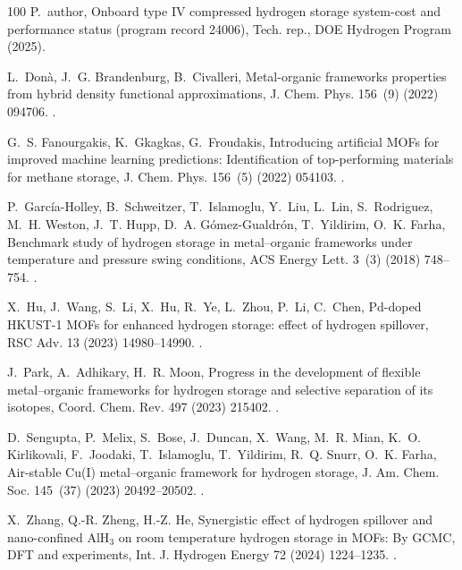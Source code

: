 \documentclass[review]{elsarticle}
\begin{document}
\begin{thebibliography}{100}
P.~author, Onboard type {IV} compressed hydrogen storage system-cost and
  performance status (program record 24006), Tech. rep., DOE Hydrogen Program
  (2025).

L.~Donà, J.~G. Brandenburg, B.~Civalleri, Metal-organic frameworks properties
  from hybrid density functional approximations, J. Chem. Phys. 156~(9) (2022)
  094706.
\newblock \href {https://doi.org/10.1063/5.0080359}
  {}.

G.~S. Fanourgakis, K.~Gkagkas, G.~Froudakis, Introducing artificial {MOFs} for
  improved machine learning predictions: Identification of top-performing
  materials for methane storage, J. Chem. Phys. 156~(5) (2022) 054103.
\newblock \href {https://doi.org/10.1063/5.0075994}
  {}.

P.~Garc\'ia-Holley, B.~Schweitzer, T.~Islamoglu, Y.~Liu, L.~Lin, S.~Rodriguez,
  M.~H. Weston, J.~T. Hupp, D.~A. G\'omez-Gualdr\'on, T.~Yildirim, O.~K. Farha,
  Benchmark study of hydrogen storage in metal–organic frameworks under
  temperature and pressure swing conditions, ACS Energy Lett. 3~(3) (2018)
  748--754.
\newblock \href {https://doi.org/10.1021/acsenergylett.8b00154}
  {}.

X.~Hu, J.~Wang, S.~Li, X.~Hu, R.~Ye, L.~Zhou, P.~Li, C.~Chen, {Pd-}doped
  {HKUST-1} {MOFs} for enhanced hydrogen storage: effect of hydrogen spillover,
  RSC Adv. 13 (2023) 14980--14990.
\newblock \href {https://doi.org/10.1039/D3RA01788E}
  {}.

J.~Park, A.~Adhikary, H.~R. Moon, Progress in the development of flexible
  metal–organic frameworks for hydrogen storage and selective separation of
  its isotopes, Coord. Chem. Rev. 497 (2023) 215402.
\newblock \href {https://doi.org/10.1016/j.ccr.2023.215402}
  {}.

D.~Sengupta, P.~Melix, S.~Bose, J.~Duncan, X.~Wang, M.~R. Mian, K.~O.
  Kirlikovali, F.~Joodaki, T.~Islamoglu, T.~Yildirim, R.~Q. Snurr, O.~K. Farha,
  Air-stable {Cu(I)} metal–organic framework for hydrogen storage, J. Am.
  Chem. Soc. 145~(37) (2023) 20492--20502.
\newblock \href {https://doi.org/10.1021/jacs.3c06393}
  {}.

X.~Zhang, Q.-R. Zheng, H.-Z. He, Synergistic effect of hydrogen spillover and
  nano-confined {AlH}$_3$ on room temperature hydrogen storage in {MOFs}: By
  {GCMC}, {DFT} and experiments, Int. J. Hydrogen Energy 72 (2024) 1224--1235.
\newblock \href {https://doi.org/10.1016/j.ijhydene.2023.05.227}
  {}.


\end{thebibliography}
\end{document}
